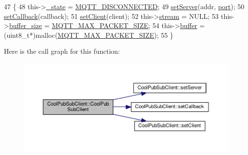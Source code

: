 \begin{DoxyCode}
47                                                                                                          \{
48     this->\hyperlink{class_cool_pub_sub_client_aa1953b601206252a30efa5b114eb3e1a}{\_state} = \hyperlink{_cool_pub_sub_client_8h_adaf86a906a305dd129164982d50111b3}{MQTT\_DISCONNECTED};
49     \hyperlink{class_cool_pub_sub_client_a947e70c394c66c7d08d0c53caf8425e3}{setServer}(addr, \hyperlink{class_cool_pub_sub_client_a01e3249102c057756af7a515c179844e}{port});
50     \hyperlink{class_cool_pub_sub_client_ac5cab7658f1bdded32131241e468e661}{setCallback}(callback);
51     \hyperlink{class_cool_pub_sub_client_a7ee119b786010561ab6a9afa0798e91d}{setClient}(client);
52     this->\hyperlink{class_cool_pub_sub_client_a7a92417b317e7bd9502ed37752111705}{stream} = NULL;
53     this->\hyperlink{class_cool_pub_sub_client_ae6cb10e42c057483d53516ac830ab526}{buffer\_size} = \hyperlink{_cool_pub_sub_client_8h_ae09b594688a59f1427c7e45259e039b9}{MQTT\_MAX\_PACKET\_SIZE};
54     this->\hyperlink{class_cool_pub_sub_client_a7e8bcc6096626916046a51bebadc7851}{buffer} = (uint8\_t*)malloc(\hyperlink{_cool_pub_sub_client_8h_ae09b594688a59f1427c7e45259e039b9}{MQTT\_MAX\_PACKET\_SIZE});
55 \}
\end{DoxyCode}
Here is the call graph for this function\+:\nopagebreak
\begin{figure}[H]
\begin{center}
\leavevmode
\includegraphics[width=350pt]{d8/d4b/class_cool_pub_sub_client_a1743a9eeef19b3b6ff1db5be8df55a9c_cgraph}
\end{center}
\end{figure}
\mbox{\label{class_cool_pub_sub_client_a0797679d710bf2b1aa802107bdb1a2fe}} 
